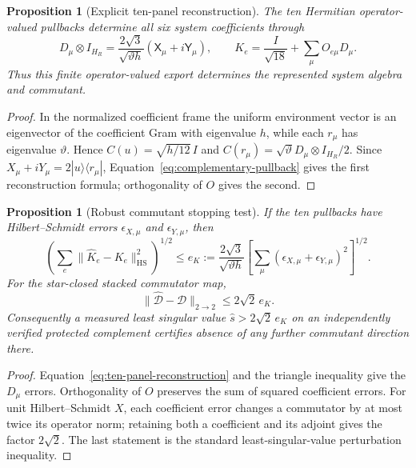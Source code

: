 \documentclass[11pt]{article}
\numberwithin{equation}{section}
\newtheorem{proposition}[theorem]{Proposition}
\theoremstyle{definition}
\theoremstyle{remark}
\newcommand{\HS}{\mathrm{HS}}
\begin{document}
\begin{proposition}[Explicit ten-panel reconstruction]
\label{prop:ten-panel-reconstruction}
The ten Hermitian operator-valued pullbacks determine all six system
coefficients through
\begin{equation}
 D_\mu\otimes I_{H_R}
 =\frac{2\sqrt3}{\sqrt{\vartheta h}}
   (\mathsf X_\mu+i\mathsf Y_\mu),
 \qquad
 K_e=\frac{I}{\sqrt{18}}+\sum_\mu O_{e\mu}D_\mu.
 \label{eq:ten-panel-reconstruction}
\end{equation}
Thus this finite operator-valued export determines the represented system
algebra and commutant.
\end{proposition}

\begin{proof}
In the normalized coefficient frame the uniform environment vector is an
eigenvector of the coefficient Gram with eigenvalue $h$, while each
$r_\mu$ has eigenvalue $\vartheta$.  Hence
$C(u)=\sqrt{h/12}\,I$ and
$C(r_\mu)=\sqrt\vartheta D_\mu\otimes I_{H_R}/2$.
Since $X_\mu+iY_\mu=2|u\rangle\langle r_\mu|$,
Equation~\eqref{eq:complementary-pullback} gives the first reconstruction
formula; orthogonality of $O$ gives the second.
\end{proof}

\begin{proposition}[Robust commutant stopping test]
\label{prop:reconstruction-error}
If the ten pullbacks have Hilbert--Schmidt errors
$\epsilon_{X,\mu}$ and $\epsilon_{Y,\mu}$, then
\begin{equation}
 \left(\sum_e\|\widehat K_e-K_e\|_{\HS}^2\right)^{1/2}
 \le e_K:=\frac{2\sqrt3}{\sqrt{\vartheta h}}
 \left[\sum_\mu(\epsilon_{X,\mu}+\epsilon_{Y,\mu})^2\right]^{1/2}.
 \label{eq:appendix-reconstruction-error}
\end{equation}
For the star-closed stacked commutator map,
\begin{equation}
 \|\widehat{\mathscr D}-\mathscr D\|_{2\to2}\le2\sqrt2\,e_K.
 \label{eq:appendix-commutator-error}
\end{equation}
Consequently a measured least singular value
$\widehat s>2\sqrt2\,e_K$ on an independently verified protected complement
certifies absence of any further commutant direction there.
\end{proposition}

\begin{proof}
Equation~\eqref{eq:ten-panel-reconstruction} and the triangle inequality give
the $D_\mu$ errors.  Orthogonality of $O$ preserves the sum of squared
coefficient errors.  For unit Hilbert--Schmidt $X$, each coefficient error
changes a commutator by at most twice its operator norm; retaining both a
coefficient and its adjoint gives the factor $2\sqrt2$.  The last statement
is the standard least-singular-value perturbation inequality.
\end{proof}
\end{document}
